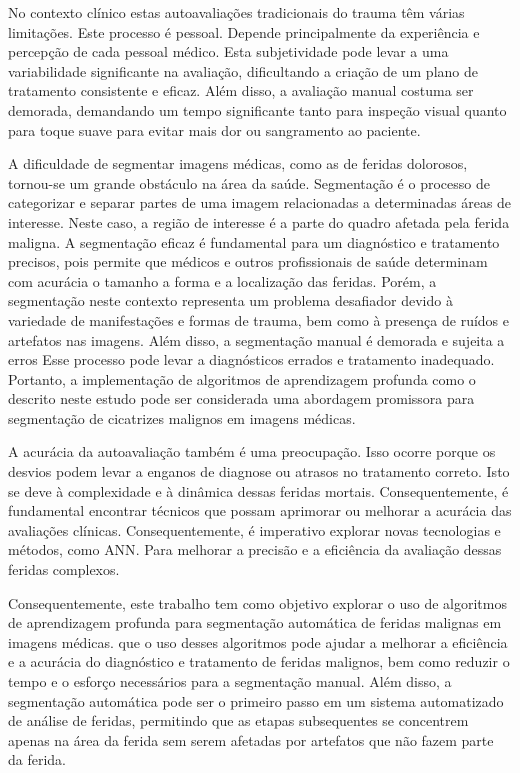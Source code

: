 No contexto clínico estas autoavaliações tradicionais do trauma têm várias limitações. Este processo é pessoal. Depende principalmente da experiência e percepção de cada pessoal médico. Esta subjetividade pode levar a uma variabilidade significante na avaliação, dificultando a criação de um plano de tratamento consistente e eficaz. Além disso, a avaliação manual costuma ser demorada, demandando um tempo significante tanto para inspeção visual quanto para toque suave para evitar mais dor ou sangramento ao paciente. 

A dificuldade de segmentar imagens médicas, como as de feridas dolorosos, tornou-se um grande obstáculo na área da saúde. Segmentação é o processo de categorizar e separar partes de uma imagem relacionadas a determinadas áreas de interesse. Neste caso, a região de interesse é a parte do quadro afetada pela ferida maligna. A segmentação eficaz é fundamental para um diagnóstico e tratamento precisos, pois permite que médicos e outros profissionais de saúde determinam com acurácia o tamanho a forma e a localização das feridas. Porém, a segmentação neste contexto representa um problema desafiador devido à variedade de manifestações e formas de trauma, bem como à presença de ruídos e artefatos nas imagens. Além disso, a segmentação manual é demorada e sujeita a erros Esse processo pode levar a diagnósticos errados e tratamento inadequado. Portanto, a implementação de algoritmos de aprendizagem profunda como o descrito neste estudo pode ser considerada uma abordagem promissora para segmentação de cicatrizes malignos em imagens médicas. 

A acurácia da autoavaliação também é uma preocupação. Isso ocorre porque os desvios podem levar a enganos de diagnose ou atrasos no tratamento correto. Isto se deve à complexidade e à dinâmica dessas feridas mortais. Consequentemente, é fundamental encontrar técnicos que possam aprimorar ou melhorar a acurácia das avaliações clínicas. Consequentemente, é imperativo explorar novas tecnologias e métodos, como \ac{ANN}. Para melhorar a precisão e a eficiência da avaliação dessas feridas complexos.

Consequentemente, este trabalho tem como objetivo explorar o uso de algoritmos de aprendizagem profunda para segmentação automática de feridas malignas em imagens médicas.  que o uso desses algoritmos pode ajudar a melhorar a eficiência e a acurácia do diagnóstico e tratamento de feridas malignos, bem como reduzir o tempo e o esforço necessários para a segmentação manual. Além disso, a segmentação automática pode ser o primeiro passo em um sistema automatizado de análise de feridas, permitindo que as etapas subsequentes se concentrem apenas na área da ferida sem serem afetadas por artefatos que não fazem parte da ferida.

